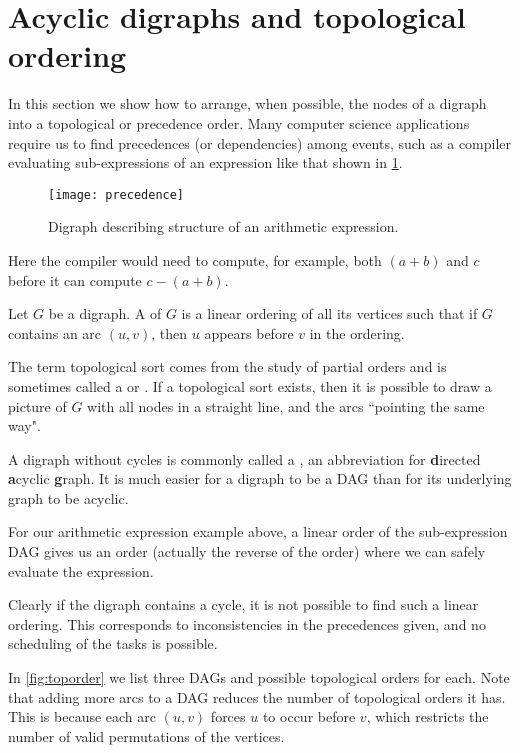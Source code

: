 \section{Acyclic digraphs and topological ordering}
\label{sec:dag}

In this section we show how to arrange, when possible, the nodes
of a digraph into a topological or precedence order.  Many computer
science applications require us to find precedences (or dependencies)
among events, such as a compiler evaluating sub-expressions of an
expression like that shown in \cref{fig:prec}.

\begin{figure}[hbtp] %
	\centering
	\texttt{[image: precedence]}
	\caption{Digraph describing structure of an arithmetic expression.}
	\label{fig:prec}
\end{figure} 

Here the compiler would need to compute, for example, both $(a+b)$ and
$c$ before it can compute $c-(a+b)$.

\begin{Definition}
Let $G$ be a digraph. A  of $G$ is a linear
ordering of all its vertices such that if $G$ contains an arc $(u,v)$,
then $u$ appears before $v$ in the ordering.
\end{Definition}

The term topological sort comes from the study of partial orders and is
sometimes called a  or .
 If a topological sort exists, then it is possible to draw a picture  of
$G$ with all nodes in a straight line, and the arcs ``pointing the same
way".

A digraph without cycles is commonly called a , an
abbreviation for \textbf{d}irected \textbf{a}cyclic
\textbf{g}raph. It is much easier for a digraph to be a
DAG than for its underlying graph to be acyclic. %

For our arithmetic expression example above, a linear
order of the sub-expression DAG gives us an order (actually the reverse
of the order) where we can safely evaluate the expression.

Clearly if the digraph contains a cycle, it is not possible to find
such a linear ordering. This corresponds to inconsistencies in the
precedences given, and no scheduling of the tasks is possible.

\begin{Example}
\label{eg:toporder}
In \cref{fig:toporder} we list three DAGs and possible topological
orders for each. Note that adding more arcs to a DAG  reduces the number
of topological orders it has.  This is because each arc $(u,v)$ forces
$u$ to occur before $v$, which restricts the number of valid permutations
of the vertices.
\end{Example}

